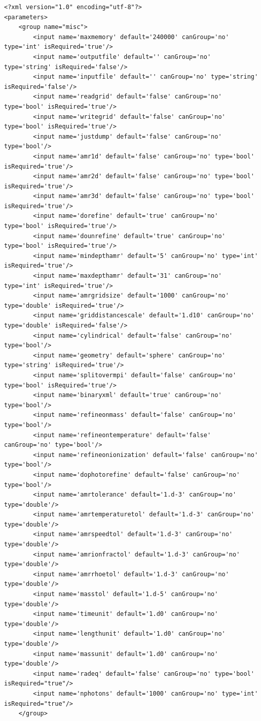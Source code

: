 \documentclass[a4paper,10pt]{article}
\begin{document}
\begin{lstlisting}
<?xml version="1.0" encoding="utf-8"?>
<parameters>
    <group name="misc">
        <input name='maxmemory' default='240000' canGroup='no' type='int' isRequired='true'/>
        <input name='outputfile' default='' canGroup='no' type='string' isRequired='false'/>
        <input name='inputfile' default='' canGroup='no' type='string' isRequired='false'/>
        <input name='readgrid' default='false' canGroup='no' type='bool' isRequired='true'/>
        <input name='writegrid' default='false' canGroup='no' type='bool' isRequired='true'/>
        <input name='justdump' default='false' canGroup='no' type='bool'/>
        <input name='amr1d' default='false' canGroup='no' type='bool' isRequired='true'/>
        <input name='amr2d' default='false' canGroup='no' type='bool' isRequired='true'/>
        <input name='amr3d' default='false' canGroup='no' type='bool' isRequired='true'/>
        <input name='dorefine' default='true' canGroup='no' type='bool' isRequired='true'/>
        <input name='dounrefine' default='true' canGroup='no' type='bool' isRequired='true'/>
        <input name='mindepthamr' default='5' canGroup='no' type='int' isRequired='true'/>
        <input name='maxdepthamr' default='31' canGroup='no' type='int' isRequired='true'/>
        <input name='amrgridsize' default='1000' canGroup='no' type='double' isRequired='true'/>
        <input name='griddistancescale' default='1.d10' canGroup='no' type='double' isRequired='false'/>
        <input name='cylindrical' default='false' canGroup='no' type='bool'/>
        <input name='geometry' default='sphere' canGroup='no' type='string' isRequired='true'/>
        <input name='splitovermpi' default='false' canGroup='no' type='bool' isRequired='true'/>
        <input name='binaryxml' default='true' canGroup='no' type='bool'/>
        <input name='refineonmass' default='false' canGroup='no' type='bool'/>
        <input name='refineontemperature' default='false' canGroup='no' type='bool'/>
        <input name='refineonionization' default='false' canGroup='no' type='bool'/>
        <input name='dophotorefine' default='false' canGroup='no' type='bool'/>
        <input name='amrtolerance' default='1.d-3' canGroup='no' type='double'/>
        <input name='amrtemperaturetol' default='1.d-3' canGroup='no' type='double'/>
        <input name='amrspeedtol' default='1.d-3' canGroup='no' type='double'/>
        <input name='amrionfractol' default='1.d-3' canGroup='no' type='double'/>
        <input name='amrrhoetol' default='1.d-3' canGroup='no' type='double'/>
        <input name='masstol' default='1.d-5' canGroup='no' type='double'/>
        <input name='timeunit' default='1.d0' canGroup='no' type='double'/>
        <input name='lengthunit' default='1.d0' canGroup='no' type='double'/>
        <input name='massunit' default='1.d0' canGroup='no' type='double'/>
        <input name='radeq' default='false' canGroup='no' type='bool' isRequired="true"/>
        <input name='nphotons' default='1000' canGroup='no' type='int' isRequired="true"/>
    </group>


\end{lstlisting}
\end{document}
